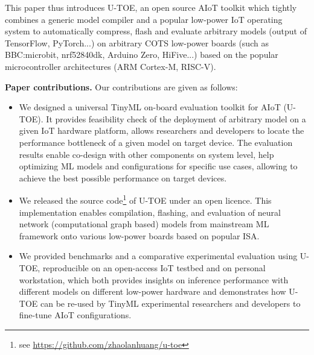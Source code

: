 This paper thus introduces U-TOE, an open source AIoT toolkit which tightly combines a generic model compiler and a popular low-power IoT operating system to automatically compress, flash and evaluate arbitrary models (output of TensorFlow, PyTorch...) on arbitrary COTS low-power boards (such as BBC:microbit, nrf52840dk, Arduino Zero, HiFive...) based on the popular microcontroller architectures (ARM Cortex-M, RISC-V). 


{\bf Paper contributions.} Our contributions are given as follows:
\begin{itemize}
    \item We designed a universal TinyML on-board evaluation toolkit for AIoT (U-TOE). It provides feasibility check of the deployment of arbitrary model on a given IoT hardware platform, allows researchers and developers to locate the performance bottleneck of a given model on target device. The evaluation results enable co-design with other components on system level, help optimizing ML models and configurations for specific use cases, allowing to achieve the best possible performance on target devices.
    
    \item We released the source code\footnote{see \url{https://github.com/zhaolanhuang/u-toe}} of U-TOE under an open licence. This implementation enables compilation, flashing, and evaluation of neural network (computational graph based) models from mainstream ML framework onto various low-power boards based on popular ISA.

    \item We provided benchmarks and a comparative experimental evaluation using U-TOE, reproducible on an open-access IoT testbed and on personal workstation, which both provides insights on inference performance with different models on different low-power hardware and
    demonstrates how U-TOE can be re-used by TinyML experimental researchers and developers to fine-tune AIoT configurations. %
\end{itemize}
